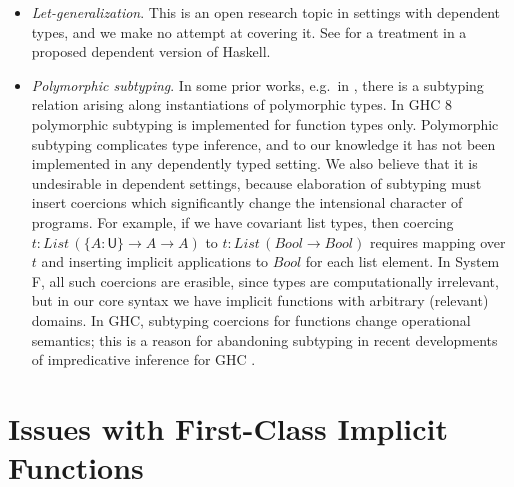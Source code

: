 \documentclass[acmsmall,review,anonymous,prologue,dvipsnames]{acmart}\settopmatter{printfolios=true,printccs=false,printacmref=false}
\renewcommand{\U}{\mathsf{U}}
\theoremstyle{remark}
\begin{document}
\begin{itemize}
  \item \emph{Let-generalization}. This is an open research topic in settings
    with dependent types, and we make no attempt at covering it. See
    \cite{eisenberg2016dependent} for a treatment in a proposed dependent
    version of Haskell.
  \item \emph{Polymorphic subtyping}. In some prior works, e.g.\ in
    \cite{dunfield2013complete, vytiniotis2008fph}, there is a subtyping
    relation arising along instantiations of polymorphic types. In GHC 8
    polymorphic subtyping is implemented for function types only. Polymorphic
    subtyping complicates type inference, and to our knowledge it has not been
    implemented in any dependently typed setting. We also believe that it is
    undesirable in dependent settings, because elaboration of subtyping must
    insert coercions which significantly change the intensional character of
    programs. For example, if we have covariant list types, then coercing $t :
    List\,(\{A : \U\}\to A \to A)$ to $t : List\,(Bool \to Bool)$ requires
    mapping over $t$ and inserting implicit applications to $Bool$ for each list
    element. In System F, all such coercions are erasible, since types are
    computationally irrelevant, but in our core syntax we have implicit
    functions with arbitrary (relevant) domains. In GHC, subtyping coercions for
    functions change operational semantics; this is a reason for abandoning
    subtyping in recent developments of impredicative inference for GHC
    \cite{serrano2020a}.
\end{itemize}

\section{Issues with First-Class Implicit Functions}
\label{sec:issues}
\end{document}
